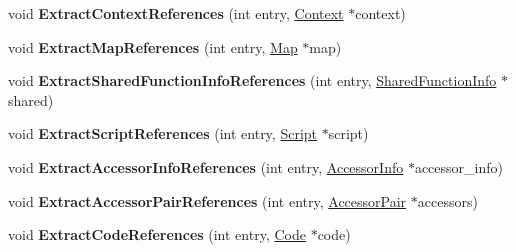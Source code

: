 \begin{DoxyCompactItemize}
\item 
void {\bfseries Extract\+Context\+References} (int entry, \hyperlink{classv8_1_1internal_1_1_context}{Context} $\ast$context)\hypertarget{classv8_1_1internal_1_1_v8_heap_explorer_aaacddb19cb7b34eaff824214a081f4a4}{}\label{classv8_1_1internal_1_1_v8_heap_explorer_aaacddb19cb7b34eaff824214a081f4a4}

\item 
void {\bfseries Extract\+Map\+References} (int entry, \hyperlink{classv8_1_1internal_1_1_map}{Map} $\ast$map)\hypertarget{classv8_1_1internal_1_1_v8_heap_explorer_a13a1a216369cdd715a0aaa24655ba887}{}\label{classv8_1_1internal_1_1_v8_heap_explorer_a13a1a216369cdd715a0aaa24655ba887}

\item 
void {\bfseries Extract\+Shared\+Function\+Info\+References} (int entry, \hyperlink{classv8_1_1internal_1_1_shared_function_info}{Shared\+Function\+Info} $\ast$shared)\hypertarget{classv8_1_1internal_1_1_v8_heap_explorer_a6581d2c64bebe2c2115cfae8d93a59a0}{}\label{classv8_1_1internal_1_1_v8_heap_explorer_a6581d2c64bebe2c2115cfae8d93a59a0}

\item 
void {\bfseries Extract\+Script\+References} (int entry, \hyperlink{classv8_1_1internal_1_1_script}{Script} $\ast$script)\hypertarget{classv8_1_1internal_1_1_v8_heap_explorer_a88fa4f2b443edbdacbbf22b4d7862941}{}\label{classv8_1_1internal_1_1_v8_heap_explorer_a88fa4f2b443edbdacbbf22b4d7862941}

\item 
void {\bfseries Extract\+Accessor\+Info\+References} (int entry, \hyperlink{classv8_1_1internal_1_1_accessor_info}{Accessor\+Info} $\ast$accessor\+\_\+info)\hypertarget{classv8_1_1internal_1_1_v8_heap_explorer_aaf7c3496249dd53d438ca868cd628b49}{}\label{classv8_1_1internal_1_1_v8_heap_explorer_aaf7c3496249dd53d438ca868cd628b49}

\item 
void {\bfseries Extract\+Accessor\+Pair\+References} (int entry, \hyperlink{classv8_1_1internal_1_1_accessor_pair}{Accessor\+Pair} $\ast$accessors)\hypertarget{classv8_1_1internal_1_1_v8_heap_explorer_aba736a3e879efe031d92efc713426cb1}{}\label{classv8_1_1internal_1_1_v8_heap_explorer_aba736a3e879efe031d92efc713426cb1}

\item 
void {\bfseries Extract\+Code\+References} (int entry, \hyperlink{classv8_1_1internal_1_1_code}{Code} $\ast$code)\hypertarget{classv8_1_1internal_1_1_v8_heap_explorer_aacad2477bd4fa8c04ea3ca873c21cfe2}{}\label{classv8_1_1internal_1_1_v8_heap_explorer_aacad2477bd4fa8c04ea3ca873c21cfe2}


\end{DoxyCompactItemize}
